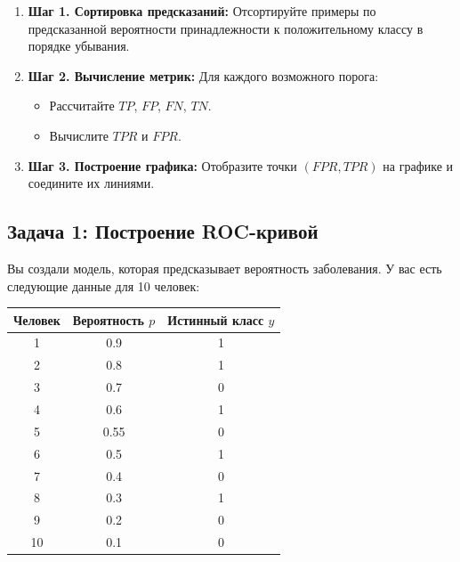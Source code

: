 \begin{enumerate}
    \item \textbf{Шаг 1. Сортировка предсказаний:} Отсортируйте примеры по предсказанной вероятности принадлежности к положительному классу в порядке убывания.
    \item \textbf{Шаг 2. Вычисление метрик:} Для каждого возможного порога:
          \begin{itemize}
              \item Рассчитайте $TP$, $FP$, $FN$, $TN$.
              \item Вычислите $TPR$ и $FPR$.
          \end{itemize}
    \item \textbf{Шаг 3. Построение графика:} Отобразите точки $(FPR, TPR)$ на графике и соедините их линиями.
\end{enumerate}


\subsection*{Задача 1: Построение ROC-кривой}

Вы создали модель, которая предсказывает вероятность заболевания. У вас есть следующие данные для 10 человек:

\begin{table}[h!]
    \centering
    \begin{tabular}{|c|c|c|}
        \hline
        \textbf{Человек} & \textbf{Вероятность $p$} & \textbf{Истинный класс $y$} \\
        \hline
        1                & 0.9                      & 1                           \\
        2                & 0.8                      & 1                           \\
        3                & 0.7                      & 0                           \\
        4                & 0.6                      & 1                           \\
        5                & 0.55                     & 0                           \\
        6                & 0.5                      & 1                           \\
        7                & 0.4                      & 0                           \\
        8                & 0.3                      & 1                           \\
        9                & 0.2                      & 0                           \\
        10               & 0.1                      & 0                           \\
        \hline
    \end{tabular}
\end{table}

